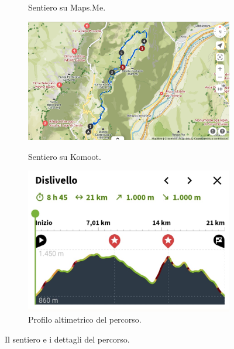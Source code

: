 \documentclass{article}
\begin{document}
\begin{figure}[htbp!]
\begin{subfigure}[t]{0.45\textwidth}
        \caption{Sentiero su Maps.Me.}
        \label{fig:foto_lunga}
    \end{subfigure}
    \hfill
    \begin{subfigure}[t]{0.45\textwidth}
        \centering
        \vspace{0pt} %
        \includegraphics[width=\textwidth]{images/sentiero_komoot.png}
        \caption{Sentiero su Komoot.}
        \label{fig:foto_corta1}
        \vspace{1em} %
        \includegraphics[width=\textwidth]{images/profilo_altimetrico.png}
        \caption{Profilo altimetrico del percorso.}
        \label{fig:foto_corta2}
    \end{subfigure}
    \caption{Il sentiero e i dettagli del percorso.}
    \label{fig:panoramica_dettagli}
\end{figure}
\end{document}

